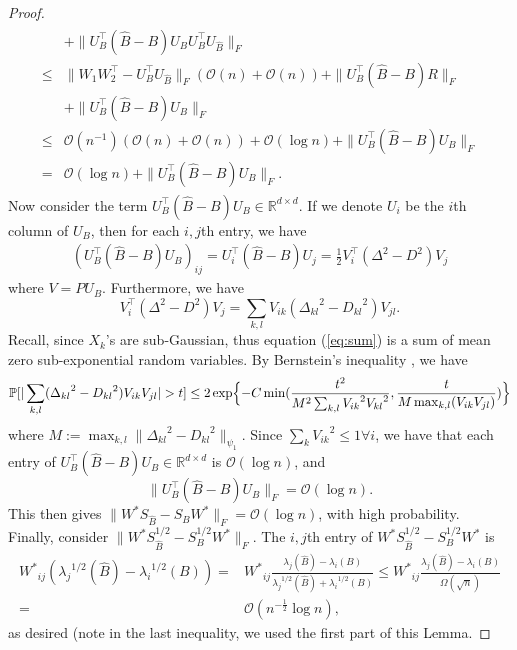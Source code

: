 \begin{proof}
\begin{align*}
\begin{array}{rl}
       & + \| U_B^{\top} (\hat{B} - B) U_B U_B^{\top} U_{\hat{B}}\|_{F} \\
       \leq & \|W_1 W_2^{\top} - U_B^{\top} {U_{\hat{B}}}\|_{F} (\mathcal{O}(n) + \mathcal{O}(n)) + \| U_B^{\top} (\hat{B} - B) R \|_{F}\\
       &  + \| U_B^{\top} (\hat{B} - B) U_B \|_{F} \\
      \leq & \mathcal{O}(n^{-1}) (\mathcal{O}(n) + \mathcal{O}(n)) + \mathcal{O}(\log n)  + \| U_B^{\top} (\hat{B} - B) U_B \|_{F} \\
      = & \mathcal{O}( \log n) + \| U_B^{\top} (\hat{B} - B) U_B \|_{F}.
     \end{array}
   \end{align*}
   Now consider the term $ U_B^{\top} (\hat{B} - B) U_B \in \mathbb{R}^{d \times d}$. If we denote $U_i$ be the $i$th column of $U_B$, then for each $i, j$th entry, we have 
   \begin{align*}
    ( U_B^{\top} (\hat{B} - B) U_B )_{ij} = U_i^{\top} (\hat{B} -B) U_j = \frac{1}{2} V_{i}^{\top} (\Delta^2 - D^2) V_j
   \end{align*}
   where $V = P U_B$.
    Furthermore, we have
    \begin{equation} \label{eq:sum}
    V_{i}^{\top} (\Delta^2 - D^2) V_j = \sum\limits_{k,l} V_{ik} ({\Delta_{kl}}^2 - {D_{kl}}^2) V_{jl}.
    \end{equation}
 Recall, since $X_k$'s are sub-Gaussian, thus equation (\ref{eq:sum}) is a sum of mean zero sub-exponential random variables. By Bernstein's inequality \citep{HDP}, we have
 $$ \mathbb{P}[ |\sum\limits_{k,l} ({\Delta_{kl}}^2 - {D_{kl}}^2) V_{ik} V_{jl} | > t] \leq  2 \exp \Bigl\{-C \min (\frac{t^2}{M^2 \sum_{k,l} {V_{ik}}^2{V_{kl}}^2}, \frac{t}{M \max_{k,l} ( V_{ik} V_{jl})}) \Bigr \} $$  
 where $M := \max_{k,l} \| {\Delta_{kl}}^2 - {D_{kl}}^2 \|_{\psi_1} $.
 Since $\sum_{k} {V_{ik}}^2 \leq 1 \forall i $, we have that each entry of $ U_B^{\top} (\hat{B} - B) U_B  \in \mathbb{R}^{d \times d}$ is $\mathcal{O}(\log n)$, and 
 \begin{equation}
 \label{important_bound}
 \| U_B^{\top} (\hat{B} - B) U_B \|_{F} = \mathcal{O} (\log n).
 \end{equation}
 This then gives $\|W^{*}S_{\hat{B}} - S_{B}W^{*}\|_{F} = \mathcal{O}(\log n)$, with high probability.\\
    Finally, consider $ \|W^{*} S_{\hat{B}}^{1/2} - S_{B}^{1/2} W^{*}\|_{F}.$ The $i, j$th entry of $W^{*} S_{\hat{B}}^{1/2} - S_{B}^{1/2} W^{*}$ is 
    \begin{align*}
    {{W^{*}}_{ij}} ( {\lambda_{j}}^{1/2}(\hat{B}) -  {\lambda_{i}}^{1/2}({B})) 
    = & {{W^{*}}_{ij}} \frac{{\lambda_{j}}(\hat{B}) -  {\lambda_{i}}({B})} {{\lambda_{j}}^{1/2}(\hat{B}) +  {\lambda_{i}}^{1/2}({B})} 
     \leq  {{W^{*}}_{ij}} \frac{{\lambda_{j}}(\hat{B}) -  {\lambda_{i}}({B})}{\Omega(\sqrt{n})} \\
     = & \mathcal{O}(n^{-\frac{1}{2}} \log  n),
    \end{align*}
    as desired (note in the last inequality, we used the first part of this Lemma.
\end{proof}
